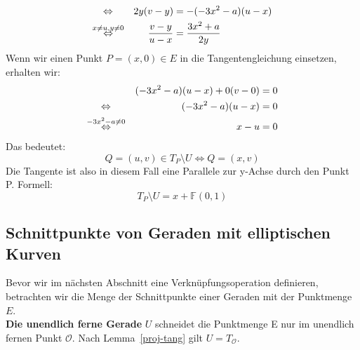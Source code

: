 \documentclass[hidelinks]{article}
\theoremstyle{plain}
\theoremstyle{definition}
\theoremstyle{rem}
\newcommand{\patinf}{\mathcal{O}}
\begin{document}
\begin{sloppypar}
\begin{alignat*}{4}
    \Leftrightarrow\hspace{1.13em}&&2y(v-y)&=-(-3x^2-a)(u-x)\\
    \stackrel{x\ne u,y\ne0}{\Leftrightarrow}&&\frac{v-y}{u-x}&=\frac{3x^2+a}{2y}
\end{alignat*}
Wenn wir einen Punkt $P=(x,0)\in E$ in die Tangentengleichung einsetzen, erhalten wir:
\begin{alignat*}{4}
    &&(-3x^2-a)(u-x)+0(v-0)&=0\\
    \Leftrightarrow\hspace{1.48em}&&(-3x^2-a)(u-x)&=0\\
    \stackrel{-3x^2-a\ne0}{\Leftrightarrow}&&x-u&=0
\end{alignat*}
Das bedeutet: 
\begin{equation*}
    Q=(u,v)\in T_P\setminus U\Leftrightarrow Q=(x,v)
\end{equation*}
Die Tangente ist also in diesem Fall eine Parallele zur y-Achse durch den Punkt P. Formell:
\begin{equation*}
    T_P\setminus U=x+\mathbb{F}(0,1)
\end{equation*}

\subsection{Schnittpunkte von Geraden mit elliptischen Kurven}
Bevor wir im nächsten Abschnitt eine Verknüpfungsoperation definieren, betrachten wir die Menge der Schnittpunkte einer Geraden mit der Punktmenge $E$.\\

\textbf{Die unendlich ferne Gerade} $U$ schneidet die Punktmenge E nur im unendlich fernen Punkt $\patinf$. Nach Lemma~\ref{proj-tang} gilt $U=T_{\patinf}$.\\


\end{sloppypar}
\end{document}
